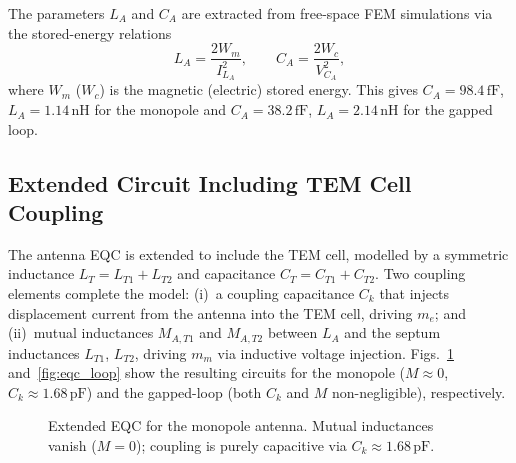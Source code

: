 \documentclass[conference]{IEEEtran}
\begin{document}
The parameters $L_A$ and $C_A$ are extracted from free-space FEM simulations
via the stored-energy relations
\begin{equation}
  L_A = \frac{2W_m}{I_{L_A}^2}, \qquad C_A = \frac{2W_c}{V_{C_A}^2},
  \label{eq:params}
\end{equation}
where $W_m$ ($W_c$) is the magnetic (electric) stored energy. This gives
$C_A = 98.4\,\text{fF}$, $L_A = 1.14\,\text{nH}$ for the monopole and
$C_A = 38.2\,\text{fF}$, $L_A = 2.14\,\text{nH}$ for the gapped loop.

\subsection{Extended Circuit Including TEM Cell Coupling}

The antenna EQC is extended to include the TEM cell, modelled by a symmetric
inductance $L_T\!=\!L_{T1}\!+\!L_{T2}$ and capacitance
$C_T\!=\!C_{T1}\!+\!C_{T2}$. Two coupling elements complete the model:
(i)~a coupling capacitance $C_k$ that injects displacement current from the
antenna into the TEM cell, driving $m_e$; and
(ii)~mutual inductances $M_{A,T1}$ and $M_{A,T2}$ between $L_A$ and the
septum inductances $L_{T1}$, $L_{T2}$, driving $m_m$ via inductive voltage
injection. Figs.~\ref{fig:eqc_monopole} and~\ref{fig:eqc_loop} show the
resulting circuits for the monopole ($M\!\approx\!0$,
$C_k\!\approx\!1.68\,\text{pF}$) and the gapped-loop (both $C_k$ and $M$
non-negligible), respectively.

\begin{figure}[t]
\centering
{}
\caption{Extended EQC for the monopole antenna. Mutual inductances vanish
  ($M\!=\!0$); coupling is purely capacitive via $C_k\!\approx\!1.68\,\text{pF}$.}
\label{fig:eqc_monopole}
\end{figure}
\end{document}
